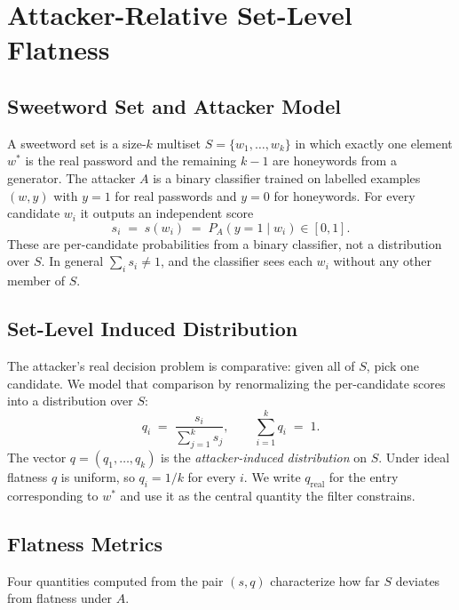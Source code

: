 \section{Attacker-Relative Set-Level Flatness}
\label{sec:method-formalism}

\subsection{Sweetword Set and Attacker Model}

A sweetword set is a size-$k$ multiset $S = \{w_1, \ldots, w_k\}$ in
which exactly one element $w^{*}$ is the real password and the remaining
$k-1$ are honeywords from a generator. The attacker $A$ is a binary
classifier trained on labelled examples $(w, y)$ with $y = 1$ for real
passwords and $y = 0$ for honeywords. For every candidate $w_i$ it
outputs an independent score
%
\begin{equation}
s_i \;=\; s(w_i) \;=\; P_A(y = 1 \mid w_i) \in [0, 1].
\end{equation}
%
These are per-candidate probabilities from a binary classifier, not a
distribution over $S$. In general $\sum_{i} s_i \neq 1$, and the
classifier sees each $w_i$ without any other member of $S$.

\subsection{Set-Level Induced Distribution}

The attacker's real decision problem is comparative: given all of $S$,
pick one candidate. We model that comparison by renormalizing the
per-candidate scores into a distribution over $S$:
%
\begin{equation}
q_i \;=\; \frac{s_i}{\sum_{j=1}^{k} s_j}, \qquad
\sum_{i=1}^{k} q_i \;=\; 1.
\label{eq:q}
\end{equation}
%
The vector $q = (q_1, \ldots, q_k)$ is the \emph{attacker-induced
distribution} on $S$. Under ideal flatness $q$ is uniform, so
$q_i = 1/k$ for every $i$. We write $q_{\text{real}}$ for the entry
corresponding to $w^{*}$ and use it as the central quantity the filter
constrains.

\subsection{Flatness Metrics}

Four quantities computed from the pair $(s, q)$ characterize how far $S$
deviates from flatness under $A$.

